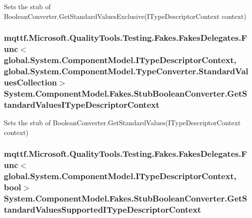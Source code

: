 Sets the stub of Boolean\-Converter.\-Get\-Standard\-Values\-Exclusive(\-I\-Type\-Descriptor\-Context context)

\hypertarget{class_system_1_1_component_model_1_1_fakes_1_1_stub_boolean_converter_ab1a2ce2a684e6ee6f9e61833a74ba16e}{
\subsubsection[{Get\-Standard\-Values\-I\-Type\-Descriptor\-Context}]{\setlength{\rightskip}{0pt plus 5cm}mqttf.\-Microsoft.\-Quality\-Tools.\-Testing.\-Fakes.\-Fakes\-Delegates.\-Func$<$global.\-System.\-Component\-Model.\-I\-Type\-Descriptor\-Context, global.\-System.\-Component\-Model.\-Type\-Converter.\-Standard\-Values\-Collection$>$ System.\-Component\-Model.\-Fakes.\-Stub\-Boolean\-Converter.\-Get\-Standard\-Values\-I\-Type\-Descriptor\-Context}}\label{class_system_1_1_component_model_1_1_fakes_1_1_stub_boolean_converter_ab1a2ce2a684e6ee6f9e61833a74ba16e}


Sets the stub of Boolean\-Converter.\-Get\-Standard\-Values(\-I\-Type\-Descriptor\-Context context)

\hypertarget{class_system_1_1_component_model_1_1_fakes_1_1_stub_boolean_converter_a5ad8e2f0a1c6a9570684141004a6c719}{
\subsubsection[{Get\-Standard\-Values\-Supported\-I\-Type\-Descriptor\-Context}]{\setlength{\rightskip}{0pt plus 5cm}mqttf.\-Microsoft.\-Quality\-Tools.\-Testing.\-Fakes.\-Fakes\-Delegates.\-Func$<$global.\-System.\-Component\-Model.\-I\-Type\-Descriptor\-Context, bool$>$ System.\-Component\-Model.\-Fakes.\-Stub\-Boolean\-Converter.\-Get\-Standard\-Values\-Supported\-I\-Type\-Descriptor\-Context}}\label{class_system_1_1_component_model_1_1_fakes_1_1_stub_boolean_converter_a5ad8e2f0a1c6a9570684141004a6c719}


